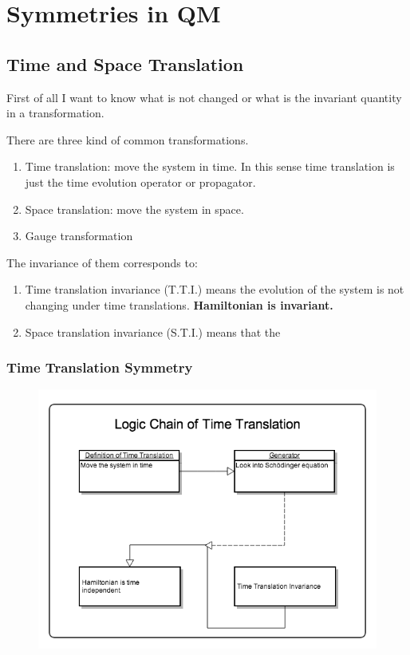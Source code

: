 \documentclass[letterpaper,10pt,english]{sphinxmanual}
\begin{document}
\section{Symmetries in QM}
\label{symmetries::doc}\label{symmetries:symmetries-in-qm}

\subsection{Time and Space Translation}
\label{symmetries:time-and-space-translation}
First of all I want to know what is not changed or what is the invariant quantity in a transformation.

There are three kind of common transformations.
\begin{enumerate}
\item {} 
Time translation: move the system in time. In this sense time translation is just the time evolution operator or propagator.

\item {} 
Space translation: move the system in space.

\item {} 
Gauge transformation

\end{enumerate}

The invariance of them corresponds to:
\begin{enumerate}
\item {} 
Time translation invariance (T.T.I.) means the evolution of the system is not changing under time translations. \textbf{Hamiltonian is invariant.}

\item {} 
Space translation invariance (S.T.I.) means that the

\end{enumerate}


\subsubsection{Time Translation Symmetry}
\label{symmetries:time-translation-symmetry}\begin{figure}[htbp]
\centering

\includegraphics{TimeTranslation.png}
\end{figure}
\end{document}
